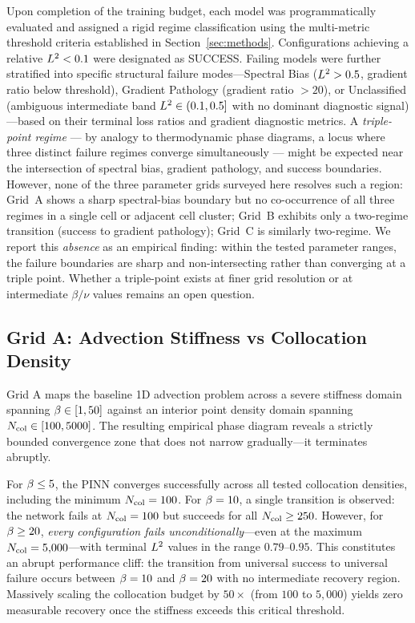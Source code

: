 Upon completion of the training budget, each model was programmatically evaluated and assigned a rigid regime classification using the multi-metric threshold criteria established in Section~\ref{sec:methods}. Configurations achieving a relative $L^2 < 0.1$ were designated as SUCCESS. Failing models were further stratified into specific structural failure modes---Spectral Bias ($L^2 > 0.5$, gradient ratio below threshold), Gradient Pathology (gradient ratio $> 20$), or Unclassified (ambiguous intermediate band $L^2 \in (0.1, 0.5]$ with no dominant diagnostic signal)---based on their terminal loss ratios and gradient diagnostic metrics. A \emph{triple-point regime} — by analogy to thermodynamic phase diagrams, a locus where three distinct failure regimes converge simultaneously — might be expected near the intersection of spectral bias, gradient pathology, and success boundaries. However, none of the three parameter grids surveyed here resolves such a region: Grid~A shows a sharp spectral-bias boundary but no co-occurrence of all three regimes in a single cell or adjacent cell cluster; Grid~B exhibits only a two-regime transition (success to gradient pathology); Grid~C is similarly two-regime. We report this \emph{absence} as an empirical finding: within the tested parameter ranges, the failure boundaries are sharp and non-intersecting rather than converging at a triple point. Whether a triple-point exists at finer grid resolution or at intermediate $\beta / \nu$ values remains an open question.

\subsection{Grid A: Advection Stiffness vs Collocation Density}

Grid A maps the baseline 1D advection problem across a severe stiffness domain spanning $\beta \in [1, 50]$ against an interior point density domain spanning $N_{\mathrm{col}} \in [100, 5000]$. The resulting empirical phase diagram reveals a strictly bounded convergence zone that does not narrow gradually—it terminates abruptly.

For $\beta \le 5$, the PINN converges successfully across all tested collocation densities, including the minimum $N_{\mathrm{col}} = 100$. For $\beta = 10$, a single transition is observed: the network fails at $N_{\mathrm{col}} = 100$ but succeeds for all $N_{\mathrm{col}} \ge 250$. However, for $\beta \ge 20$, \emph{every configuration fails unconditionally}—even at the maximum $N_{\mathrm{col}} = 5{,}000$—with terminal $L^2$ values in the range $0.79$--$0.95$. This constitutes an abrupt performance cliff: the transition from universal success to universal failure occurs between $\beta = 10$ and $\beta = 20$ with no intermediate recovery region. Massively scaling the collocation budget by $50\times$ (from $100$ to $5{,}000$) yields zero measurable recovery once the stiffness exceeds this critical threshold.


